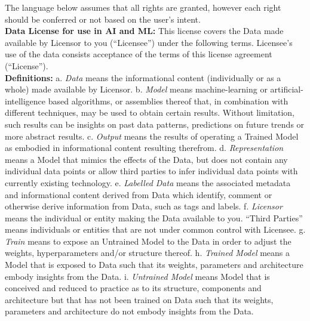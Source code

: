 \documentclass{article} %
\begin{document}
The language below assumes that all rights are granted, however each right should be conferred or not based on the user’s intent.
\\
\newline
\textbf{Data License for use in AI and ML:}
\newline
This license covers the Data made available by Licensor to you (“Licensee”) under the following terms. Licensee’s use of the data consists acceptance of the terms of this license agreement (“License”). 
\\
\newline
\textbf{Definitions:}
\newline
a. \textit{Data} means the informational content (individually or as a whole) made available by Licensor.
\newline
b. \textit{Model} means machine-learning or artificial-intelligence based algorithms, or assemblies thereof that, in combination with different techniques, may be used to obtain certain results. Without limitation, such results can be insights on past data patterns, predictions on future trends or more abstract results. 
\newline
c. \textit{Output} means the results of operating a Trained Model as embodied in informational content resulting therefrom. 
\newline
d. \textit{Representation} means a Model that mimics the effects of the Data, but does not contain any individual data points or allow third parties to infer individual data points with currently existing technology. 
\newline
e. \textit{Labelled Data} means the associated metadata and informational content derived from Data which identify, comment or otherwise derive information from Data, such as tags and labels.
\newline
f. \textit{Licensor} means the individual or entity making the Data available to you.
“Third Parties” means individuals or entities that are not under common control with Licensee.
\newline
g. \textit{Train} means to expose an Untrained Model to the Data in order to adjust the weights, hyperparameters and/or structure thereof.
\newline
h. \textit{Trained Model} means a Model that is exposed to Data such that its weights, parameters and architecture embody insights from the Data. 
\newline
i. \textit{Untrained Model} means Model that is conceived and reduced to practice as to its structure, components and architecture but that has not been trained on Data such that its weights, parameters and architecture do not embody insights from the Data. 
\\
\newline
\end{document}
